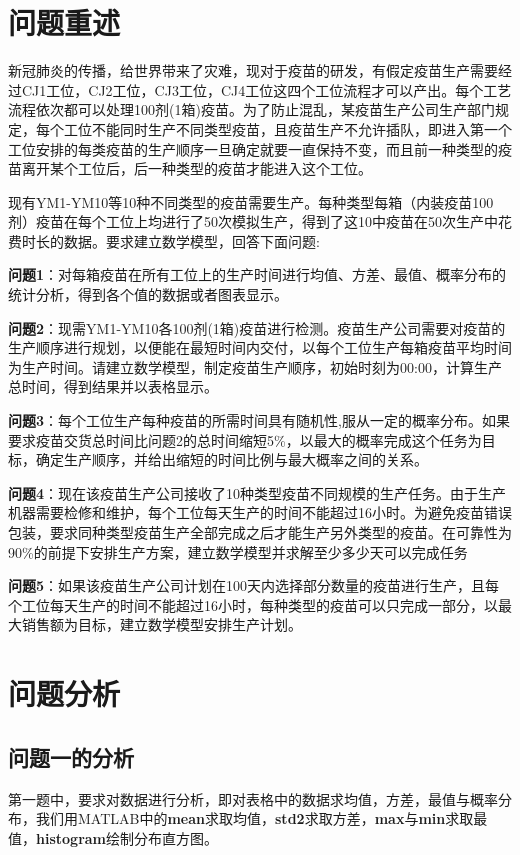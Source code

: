 \documentclass{ctexart}
\begin{document}
\section{问题重述}
新冠肺炎的传播，给世界带来了灾难，现对于疫苗的研发，有假定疫苗生产需要经过CJ1工位，CJ2工位，CJ3工位，CJ4工位这四个工位流程才可以产出。每个工艺流程依次都可以处理100剂(1箱)疫苗。为了防止混乱，某疫苗生产公司生产部门规定，每个工位不能同时生产不同类型疫苗，且疫苗生产不允许插队，即进入第一个工位安排的每类疫苗的生产顺序一旦确定就要一直保持不变，而且前一种类型的疫苗离开某个工位后，后一种类型的疫苗才能进入这个工位。\par
现有YM1-YM10等10种不同类型的疫苗需要生产。每种类型每箱（内装疫苗100剂）疫苗在每个工位上均进行了50次模拟生产，得到了这10中疫苗在50次生产中花费时长的数据。要求建立数学模型，回答下面问题: \par
\textbf{问题1}：对每箱疫苗在所有工位上的生产时间进行均值、方差、最值、概率分布的统计分析，得到各个值的数据或者图表显示。\par
\textbf{问题2}：现需YM1-YM10各100剂(1箱)疫苗进行检测。疫苗生产公司需要对疫苗的生产顺序进行规划，以便能在最短时间内交付，以每个工位生产每箱疫苗平均时间为生产时间。请建立数学模型，制定疫苗生产顺序，初始时刻为00:00，计算生产总时间，得到结果并以表格显示。\par
\textbf{问题3}：每个工位生产每种疫苗的所需时间具有随机性,服从一定的概率分布。如果要求疫苗交货总时间比问题2的总时间缩短5\%，以最大的概率完成这个任务为目标，确定生产顺序，并给出缩短的时间比例与最大概率之间的关系。\par
\textbf{问题4}：现在该疫苗生产公司接收了10种类型疫苗不同规模的生产任务。由于生产机器需要检修和维护，每个工位每天生产的时间不能超过16小时。为避免疫苗错误包装，要求同种类型疫苗生产全部完成之后才能生产另外类型的疫苗。在可靠性为90\%的前提下安排生产方案，建立数学模型并求解至少多少天可以完成任务\par
\textbf{问题5}：如果该疫苗生产公司计划在100天内选择部分数量的疫苗进行生产，且每个工位每天生产的时间不能超过16小时，每种类型的疫苗可以只完成一部分，以最大销售额为目标，建立数学模型安排生产计划。\par

\section{问题分析}
\subsection{问题一的分析}
第一题中，要求对数据进行分析，即对表格中的数据求均值，方差，最值与概率分布，我们用MATLAB中的\textbf{mean}求取均值，\textbf{std2}求取方差，\textbf{max}与\textbf{min}求取最值，\textbf{histogram}绘制分布直方图。
\end{document}
